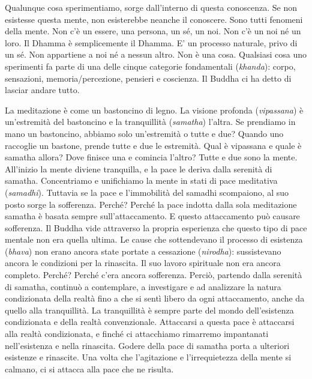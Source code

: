 Qualunque cosa sperimentiamo, sorge dall'interno di questa conoscenza.
Se non esistesse questa mente, non esisterebbe neanche il conoscere.
Sono tutti fenomeni della mente. Non c'è un essere, una persona, un sé,
un noi. Non c'è un noi né un loro. Il Dhamma è semplicemente il Dhamma.
E' un processo naturale, privo di un sé. Non appartiene a noi né a
nessun altro. Non è una cosa. Qualsiasi cosa uno sperimenti fa parte di
una delle cinque categorie fondamentali (\emph{khanda}): corpo,
sensazioni, memoria/percezione, pensieri e coscienza. Il Buddha ci ha
detto di lasciar andare tutto.

La meditazione è come un bastoncino di legno. La visione profonda
(\emph{vipassana}) è un'estremità del bastoncino e la tranquillità
(\emph{samatha}) l'altra. Se prendiamo in mano un bastoncino, abbiamo
solo un'estremità o tutte e due? Quando uno raccoglie un bastone, prende
tutte e due le estremità. Qual è vipassana e quale è samatha allora?
Dove finisce una e comincia l'altro? Tutte e due sono la mente.
All'inizio la mente diviene tranquilla, e la pace le deriva dalla
serenità di samatha. Concentriamo e unifichiamo la mente in stati di
pace meditativa (\emph{samadhi}). Tuttavia se la pace e l'immobilità del
samadhi scompaiono, al suo posto sorge la sofferenza. Perché? Perché la
pace indotta dalla sola meditazione samatha è basata sempre
sull'attaccamento. E questo attaccamento può causare sofferenza. Il
Buddha vide attraverso la propria esperienza che questo tipo di pace
mentale non era quella ultima. Le cause che sottendevano il processo di
esistenza (\emph{bhava}) non erano ancora state portate a cessazione
(\emph{nirodha}): sussistevano ancora le condizioni per la rinascita. Il
suo lavoro spirituale non era ancora completo. Perché? Perché c'era
ancora sofferenza. Perciò, partendo dalla serenità di samatha, continuò
a contemplare, a investigare e ad analizzare la natura condizionata
della realtà fino a che si sentì libero da ogni attaccamento, anche da
quello alla tranquillità. La tranquillità è sempre parte del mondo
dell'esistenza condizionata e della realtà convenzionale. Attaccarsi a
questa pace è attaccarsi alla realtà condizionata, e finché ci
attacchiamo rimarremo impantanati nell'esistenza e nella rinascita.
Godere della pace di samatha porta a ulteriori esistenze e rinascite.
Una volta che l'agitazione e l'irrequietezza della mente si calmano, ci
si attacca alla pace che ne risulta.


